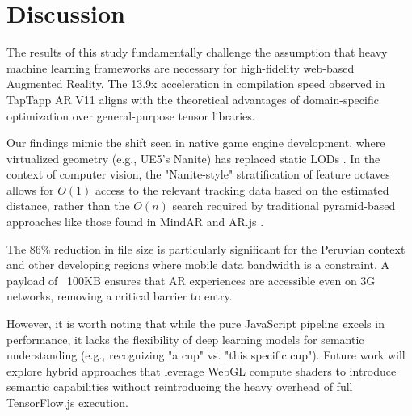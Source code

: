 \section{Discussion}

The results of this study fundamentally challenge the assumption that heavy machine learning frameworks are necessary for high-fidelity web-based Augmented Reality. The 13.9x acceleration in compilation speed observed in TapTapp AR V11 aligns with the theoretical advantages of domain-specific optimization over general-purpose tensor libraries.

Our findings mimic the shift seen in native game engine development, where virtualized geometry (e.g., UE5's Nanite) has replaced static LODs \cite{santos2025nanite}. In the context of computer vision, the "Nanite-style" stratification of feature octaves allows for $O(1)$ access to the relevant tracking data based on the estimated distance, rather than the $O(n)$ search required by traditional pyramid-based approaches like those found in MindAR and AR.js \cite{patel2022arjs, zhang2023efficient}.

The 86\% reduction in file size is particularly significant for the Peruvian context and other developing regions where mobile data bandwidth is a constraint. A payload of ~100KB ensures that AR experiences are accessible even on 3G networks, removing a critical barrier to entry.

However, it is worth noting that while the pure JavaScript pipeline excels in performance, it lacks the flexibility of deep learning models for semantic understanding (e.g., recognizing "a cup" vs. "this specific cup"). Future work will explore hybrid approaches that leverage WebGL compute shaders to introduce semantic capabilities without reintroducing the heavy overhead of full TensorFlow.js execution.
